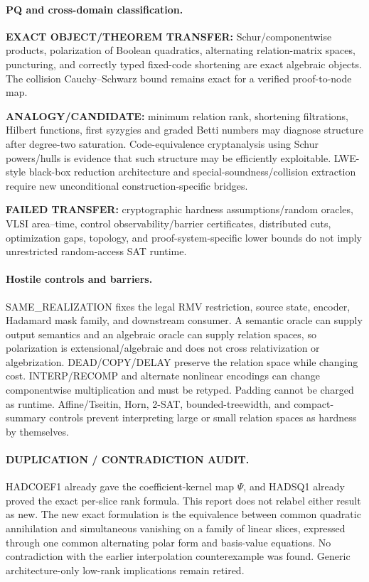 \documentclass[11pt]{article}
\begin{document}
\paragraph{PQ and cross-domain classification.}
\textbf{EXACT OBJECT/THEOREM TRANSFER:} Schur/componentwise products, polarization of Boolean quadratics, alternating relation-matrix spaces, puncturing, and correctly typed fixed-code shortening are exact algebraic objects. The collision Cauchy--Schwarz bound remains exact for a verified proof-to-node map.

\textbf{ANALOGY/CANDIDATE:} minimum relation rank, shortening filtrations, Hilbert functions, first syzygies and graded Betti numbers may diagnose structure after degree-two saturation. Code-equivalence cryptanalysis using Schur powers/hulls is evidence that such structure may be efficiently exploitable. LWE-style black-box reduction architecture and special-soundness/collision extraction require new unconditional construction-specific bridges.

\textbf{FAILED TRANSFER:} cryptographic hardness assumptions/random oracles, VLSI area--time, control observability/barrier certificates, distributed cuts, optimization gaps, topology, and proof-system-specific lower bounds do not imply unrestricted random-access SAT runtime.

\paragraph{Hostile controls and barriers.}
SAME\_REALIZATION fixes the legal RMV restriction, source state, encoder, Hadamard mask family, and downstream consumer. A semantic oracle can supply output semantics and an algebraic oracle can supply relation spaces, so polarization is extensional/algebraic and does not cross relativization or algebrization. DEAD/COPY/DELAY preserve the relation space while changing cost. INTERP/RECOMP and alternate nonlinear encodings can change componentwise multiplication and must be retyped. Padding cannot be charged as runtime. Affine/Tseitin, Horn, 2-SAT, bounded-treewidth, and compact-summary controls prevent interpreting large or small relation spaces as hardness by themselves.

\paragraph{DUPLICATION / CONTRADICTION AUDIT.}
HADCOEF1 already gave the coefficient-kernel map \(\Psi\), and HADSQ1 already proved the exact per-slice rank formula. This report does not relabel either result as new. The new exact formulation is the equivalence between common quadratic annihilation and simultaneous vanishing on a family of linear slices, expressed through one common alternating polar form and basis-value equations. No contradiction with the earlier interpolation counterexample was found. Generic architecture-only low-rank implications remain retired.
\end{document}
